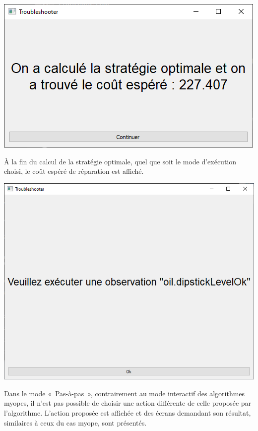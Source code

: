 \documentclass[a4paper,11pt]{article}
\theoremstyle{plain}
\theoremstyle{definition}
\begin{document}
\begin{center}
\includegraphics[scale=0.667]{Figures/exato_3_arvore1}
\end{center}
À la fin du calcul de la stratégie optimale, quel que soit le mode d'exécution choisi, le coût espéré de réparation est affiché.

\clearpage

\begin{center}
\includegraphics[scale=0.667]{Figures/exato_3_pas_a_pas1}
\end{center}
Dans le mode «~Pas-à-pas~», contrairement au mode interactif des algorithmes myopes, il n'est pas possible de choisir une action différente de celle proposée par l'algorithme. L'action proposée est affichée et des écrans demandant son résultat, similaires à ceux du cas myope, sont présentés.
\end{document}
